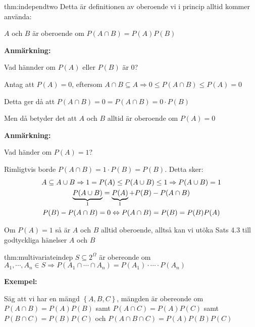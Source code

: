 \begin{theo}{thm:independtwo}
  Detta är definitionen av oberoende vi i princip alltid kommer använda:\par
  \noindent $A$ och $B$ är oberoende om $P(A\cap B) = P(A)P(B)$
\end{theo}
\par\bigskip
\noindent\textbf{Anmärkning:}\par
\noindent Vad hännder om $P(A)$ eller $P(B)$ är 0?\par
\noindent Antag att $P(A) = 0$, eftersom $A\cap B\subseteq A\Rightarrow 0\leq P(A\cap B)\leq P(A) = 0$\par
\noindent Detta ger då att $P(A\cap B) = 0 = P(A\cap B) = 0\cdot P(B)$\par
\noindent Men då betyder det att $A$ och $B$ alltid är oberoende om $P(A) = 0$
\par\bigskip
\noindent\textbf{Anmärkning:}\par
\noindent Vad händer om $P(A) = 1$?\par
\noindent Rimligtvis borde $P(A\cap B) = 1\cdot P(B) = P(B)$. Detta sker:
\begin{equation*}
  \begin{gathered}
    A\subseteq A\cup B\Rightarrow 1 = P(A)\leq P(A\cup B)\leq 1\Rightarrow P(A\cup B) = 1\\
    \underbrace{P(A\cup B)}_{\text{1}} = \underbrace{P(A)}_{\text{1}}+P(B)-P(A\cap B)\\
    P(B)-P(A\cap B) = 0\Leftrightarrow P(A\cap B) = P(B) = P(B)P(A)
  \end{gathered}
\end{equation*}
\par\bigskip
\noindent Om $P(A) = 1$ så är $A$ och $B$ alltid oberoende, alltså kan vi utöka Sats 4.3 till godtyckliga hänelser $A$ och $B$
\par\bigskip
\begin{theo}{thm:multivariateindep}
  $S\subseteq 2^{\Omega}$ är obereonde om $A_1,\cdots, A_n\in S\Rightarrow P(A_1\cap\cdots\cap A_n) = P(A_1)\cdot\cdots\cdot P(A_n)$
\end{theo}
\par\bigskip
\noindent\textbf{Exempel:}\par
\noindent Säg att vi har en mängd $\left\{A,B,C\right\}$, mängden är obereonde om $P(A\cap B) = P(A)P(B)$ samt $P(A\cap C) = P(A)P(C)$ samt $P(B\cap C) = P(B)P(C)$ och $P(A\cap B\cap C) = P(A)P(B)P(C)$\par
